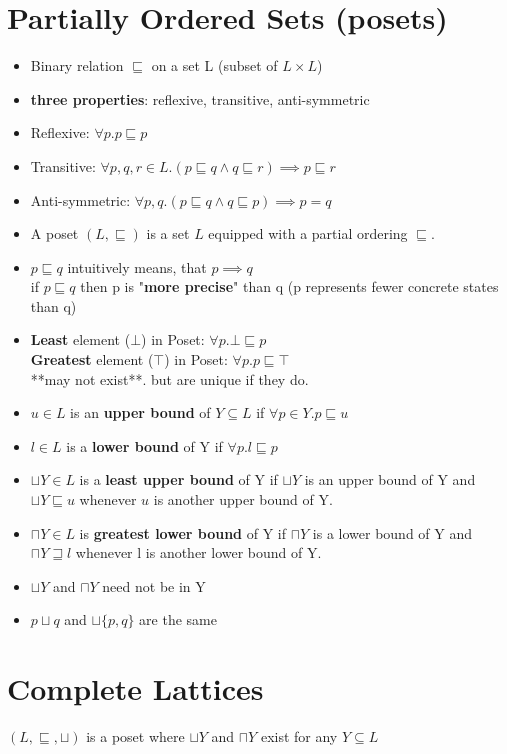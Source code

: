 \section{Partially Ordered Sets (posets)}
\begin{itemize}
 \item Binary relation $\sqsubseteq$ on a set L (subset of $L \times L$)
 \item \textbf{three properties}: reflexive, transitive, anti-symmetric
 \item Reflexive: $\forall p . p \sqsubseteq p$
 \item Transitive: $\forall {p,q,r} \in L . (p \sqsubseteq q \land q \sqsubseteq r) \implies p \sqsubseteq r$
 \item Anti-symmetric: $\forall p,q . (p \sqsubseteq q \land q \sqsubseteq p) \implies p = q$

\item A poset $(L, \sqsubseteq)$ is a set $L$ equipped with a partial ordering $\sqsubseteq$.
\item $p \sqsubseteq q$ intuitively means, that $p \implies q$ \\
if $p \sqsubseteq q$ then p is "\textbf{more precise}" than q (p represents fewer concrete states than q)

\item \textbf{Least} element ($\bot$) in Poset: $\forall p . \bot \sqsubseteq p$ \\ 
\textbf{Greatest} element ($\top$) in Poset: $\forall p . p \sqsubseteq \top$ \\ **may not exist**. but are unique if they do.
\item $u \in L$ is an \textbf{upper bound} of $Y \subseteq L$ if $\forall p \in Y . p \sqsubseteq u$
\item $l \in L$ is a \textbf{lower bound} of Y if $\forall p . l \sqsubseteq p$
\item $\sqcup Y \in L$ is a \textbf{least upper bound} of Y if $\sqcup Y$ is an upper bound of Y and $\sqcup Y \sqsubseteq u$ whenever $u$ is another upper bound of Y.
\item $\sqcap Y \in L$ is \textbf{greatest lower bound} of Y if $\sqcap Y$ is a lower bound of Y and $\sqcap Y \sqsupseteq l$ whenever l is another lower bound of Y.
\item $\sqcup Y$ and $\sqcap Y$ need not be in Y
\item $p \sqcup q$ and $\sqcup\{p,q\}$ are the same
\end{itemize}
\section{Complete Lattices}
$(L,\sqsubseteq,\sqcup)$ is a poset where $\sqcup Y$ and $\sqcap Y$ exist for any $Y \subseteq L$
